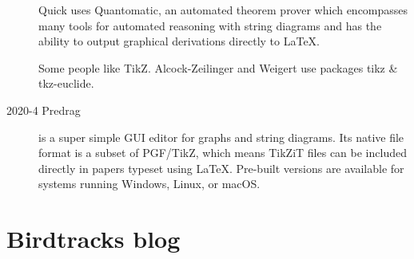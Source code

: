 \begin{description}
Quick  uses 
{Quantomatic}, an automated theorem prover which  encompasses many tools for
automated reasoning with string diagrams and has the ability to output
graphical derivations directly to LaTeX.

Some people like  {TikZ}.
Alcock-Zeilinger and Weigert use packages {tikz} \& {tkz-euclide}.

\item[2020-4 Predrag]
 is a super simple GUI editor for
graphs and string diagrams. Its native file format is a subset of
PGF/TikZ, which means TikZiT files can be included directly in papers
typeset using LaTeX. Pre-built versions are available for systems running
Windows, Linux, or macOS.

\end{description}

\section{Birdtracks blog}
\label{s-birdtrBlog}

